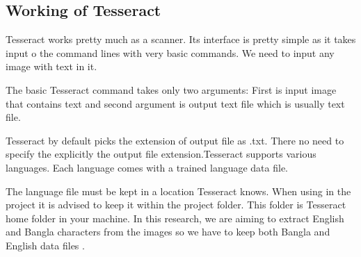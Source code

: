 \subsection{Working of Tesseract}
Tesseract works pretty much as a scanner. Its interface is pretty simple as it takes input o the command lines with very basic commands. We need to input any image with text in it.

The basic Tesseract command takes only two arguments: First is input image that contains text and second argument is output text file which is usually text file.

Tesseract by default picks the extension of output file as .txt. There no need to specify the explicitly the output file extension.Tesseract supports various languages. Each language comes with a trained language data file.

The language file must be kept in a location Tesseract knows. When using in the project it is advised to keep it within the project folder. This folder is Tesseract home folder in your machine. In this research, we are aiming to extract English and Bangla characters from the images so we have to keep both Bangla and English data files \cite{TesseractORCEngine}.
 
